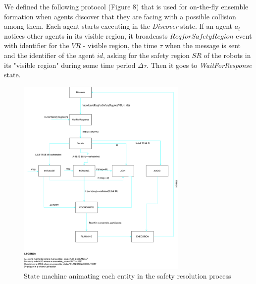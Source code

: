 \documentclass[journal]{IEEEtran}
\theoremstyle{definition}
\begin{document}
We defined the following protocol (Figure 8) that is used for on-the-fly ensemble formation when agents discover that they are facing with a possible collision among them. Each agent starts executing in the \textit{Discover} state. 
If an agent $a_i$ notices other agents in its visible region, it broadcasts $ReqforSafetyRegion$ event with identifier for the $VR$ - visible  region, the time $\tau$ when the message is sent and the identifier of the agent $id$, asking for the safety region $SR$ of the robots in its "visible region" during some time period $\Delta\tau$. Then it goes to \textit{WaitForResponse} state.

\begin{figure}[h]
\includegraphics[width=3.25in]{Figures/SafetyResolution_FF.pdf}
\caption{State machine animating each entity in the safety resolution process}
\end{figure}
\end{document}
